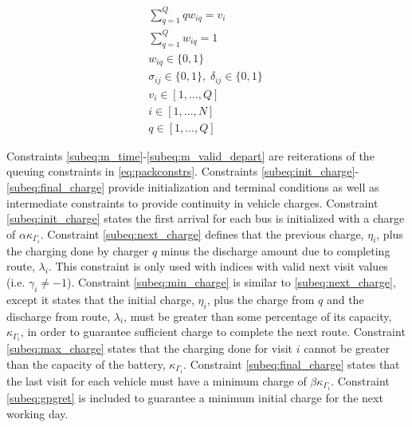 \documentclass[letterpaper, 10pt, conference]{IEEEtran}
\begin{document}
\begin{subequations}
\begin{align}
    \sum_{q=1}^Q qw_{iq} = v_i                                              \label{subeq:wmax}           \\
    \sum_{q=1}^Q w_{iq} = 1                                                 \label{subeq:wone}           \\
    w_{iq} \in \{0,1\}                                                      \label{subeq:wspace}         \\
    \sigma_{ij} \in \{0,1\},\;\delta_{ij} \in \{0,1\}\;                     \label{subeq:sdspace}        \\
    v_i \in  [1,...,Q ]                                                     \label{subeq:vspace}         \\
    i \in [1,...,N]                                                        \label{subeq:ispace}          \\
    q \in [1,...,Q] 							   \label{subeq:qspace}
\end{align}
\end{subequations}

Constraints \eqref{subeq:m_time}-\eqref{subeq:m_valid_depart} are reiterations of the queuing constraints in \eqref{eq:packconstrs}. Constraints \eqref{subeq:init_charge}-\eqref{subeq:final_charge} provide initialization and terminal conditions as well as intermediate constraints to provide continuity in vehicle charges. Constraint \eqref{subeq:init_charge} states the first arrival for each bus is initialized with a charge of $\alpha \kappa_{\Gamma_i}$. Constraint \eqref{subeq:next_charge} defines that the previous charge, $\eta_i$, plus the charging done by charger $q$ minus the discharge amount due to completing route, $\lambda_i$. This constraint is only used with indices with valid next visit values (i.e. $\gamma_i \neq -1$). Constraint \eqref{subeq:min_charge} is similar to \eqref{subeq:next_charge}, except it states that the initial charge, $\eta_i$, plus the charge from $q$ and the discharge from route, $\lambda_i$, must be greater than some percentage of its capacity, $\kappa_{\Gamma_i}$, in order to guarantee sufficient charge to complete the next route. Constraint \eqref{subeq:max_charge} states that the charging done for visit $i$ cannot be greater than the capacity of the battery, $\kappa_{\Gamma_i}$. Constraint \eqref{subeq:final_charge} states that the last visit for each vehicle must have a minimum charge of $\beta \kappa_{\Gamma_i}$. Constraint \eqref{subeq:gpgret} is included to guarantee a minimum initial charge for the next working day.
\end{document}
